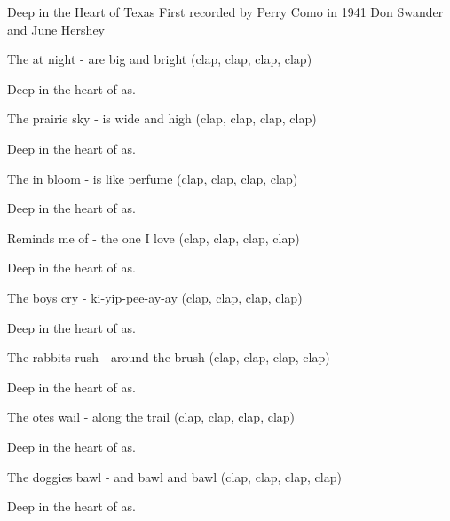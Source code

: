 \begin{SBSong}{Deep in the Heart of Texas}
  {First recorded by Perry Como in 1941}
  {Don Swander and June Hershey}
  \begin{SBVerse}
    The  at night - are big and bright (clap, clap, clap, clap)

    Deep in the heart of as.

    The prairie sky - is wide and high (clap, clap, clap, clap)

    Deep in the heart of as.
  \end{SBVerse}
  \begin{SBVerse}
    The  in bloom - is like perfume (clap, clap, clap, clap)

    Deep in the heart of as.

    Reminds me of - the one I love (clap, clap, clap, clap)

    Deep in the heart of as.
  \end{SBVerse}
  \begin{SBVerse}
    The boys cry - ki-yip-pee-ay-ay (clap, clap, clap, clap)

    Deep in the heart of as.

    The rabbits rush - around the brush (clap, clap, clap, clap)

    Deep in the heart of as.
  \end{SBVerse}
  \begin{SBVerse}
    The otes wail - along the trail (clap, clap, clap, clap)

    Deep in the heart of as.

    The doggies bawl - and bawl and bawl (clap, clap, clap, clap)

    Deep in the heart of as.
  \end{SBVerse}
\end{SBSong}
